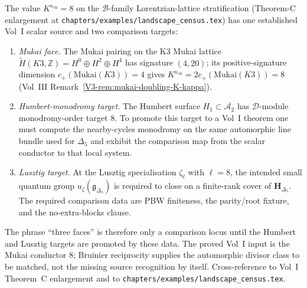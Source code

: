 \begin{remark}[Structural target for $K^{\kappa_{\mathrm{ch}}} = 8$]
\label{rem:as-gelfand-8-three-faces}
The value $K^{\kappa_{\mathrm{ch}}} = 8$ on the $\mathcal{B}$-family
Lorentzian-lattice stratification (Theorem-C enlargement at
\texttt{chapters/examples/landscape\_census.tex}) has one established
Vol~I scalar source and two comparison targets:
\begin{enumerate}[label=\textup{(\roman*)}]
\item \emph{Mukai face.} The Mukai pairing on the K3 Mukai lattice
 $\widetilde{H}(K3,\mathbb{Z}) = H^0\oplus H^2\oplus H^4$ has signature
 $(4,20)$; its positive-signature dimension $c_+(\mathrm{Mukai}(K3))=4$
 gives $K^{\kappa_{\mathrm{ch}}} = 2 c_+(\mathrm{Mukai}(K3)) = 8$
 (Vol~III Remark~\ref*{V3-rem:mukai-doubling-K-kappa}).
\item \emph{Humbert-monodromy target.} The Humbert surface
 $H_1 \subset \overline{\mathcal{A}_2}$ has $\mathcal{D}$-module
 monodromy-order target $8$. To promote this target to a Vol~I
 theorem one must compute the nearby-cycles monodromy on the same
 automorphic line bundle used for $\Delta_5$ and exhibit the comparison
 map from the scalar conductor to that local system.
\item \emph{Lusztig target.} At the Lusztig specialisation
 $\zeta_\ell$ with $\ell=8$, the intended small quantum group
$u_\zeta(\mathfrak{g}_{\Delta_5})$ is required to close on a finite-rank
cover of $\mathbf{H}_{\Delta_5}$. The required comparison data are PBW
 finiteness, the parity/root fixture, and the no-extra-blocks clause.
\end{enumerate}
The phrase ``three faces'' is therefore only a comparison locus until
the Humbert and Lusztig targets are promoted by these data. The
proved Vol~I input is the Mukai conductor \(8\); Bruinier reciprocity
supplies the automorphic divisor class to be matched, not the missing
source recognition by itself. Cross-reference to Vol~I Theorem~C
enlargement and to \texttt{chapters/examples/landscape\_census.tex}.
\end{remark}

